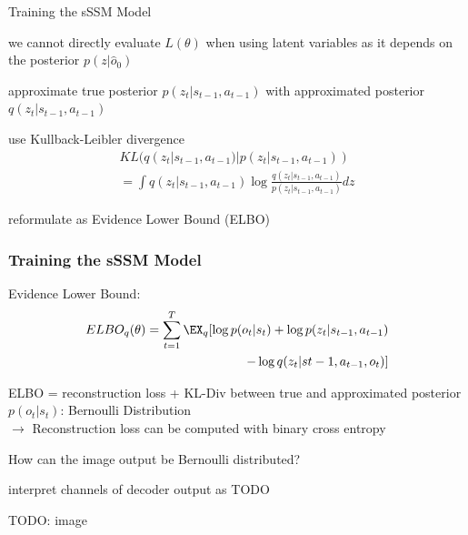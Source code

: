 \begin{frame}{Training the sSSM Model}
		\begin{PraesentationAufzaehlung}
			\item we cannot directly evaluate $L(\theta)$ when using latent variables as it depends on the posterior $p(z|\hat{o}_0)$
			\item approximate true posterior $p(z_t|s_{t-1},a_{t-1})$ with approximated posterior $q(z_t|s_{t-1},a_{t-1})$
			\item use Kullback-Leibler divergence
			\begin{equation}
			\begin{aligned}
				KL(q(z_t|s_{t-1},a_{t-1})|p(z_t|s_{t-1},a_{t-1})) \\= \int q(z_t|s_{t-1},a_{t-1}) \log \frac{q(z_t|s_{t-1},a_{t-1})}{p(z_t|s_{t-1},a_{t-1})}dz
			\end{aligned}			
			\end{equation}
			\item reformulate as Evidence Lower Bound (ELBO)
		\end{PraesentationAufzaehlung}
\end{frame}

\begin{frame}
	\frametitle{Training the sSSM Model}
        Evidence Lower Bound:
        \begin{equation}
        \begin{aligned}
            ELBO_q(\theta) = \sum_{t=1}^T \EX_q[\log p(o_t|s_t) + \log p(z_t|s_{t-1}, a_{t-1})\\ - \log q(z_t|s{t-1}, a_{t-1}, o_t)]
        \end{aligned}
        \end{equation}
        
        ELBO = reconstruction loss + KL-Div between true and approximated posterior\\
        $p(o_t|s_t)$: Bernoulli Distribution \\
        $\rightarrow$ Reconstruction loss can be computed with binary cross entropy
\end{frame}

\begin{frame}
        How can the image output be Bernoulli distributed?
        \begin{PraesentationAufzaehlung}
        	\item interpret channels of decoder output as TODO
        \end{PraesentationAufzaehlung}
        TODO: image
\end{frame}

